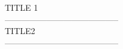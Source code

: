 \documentclass[11pt]{article}
\begin{document}
\begin{center}
    \textsc{\Large TITLE 1}\\[0.5cm]
    -----------------------------------------\\
    \textsc{\large TITLE2}\\[0.5cm]
    -----------------------------------------\\
\end{center}
\end{document}
